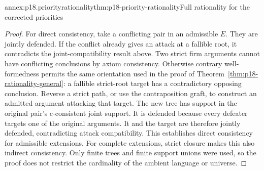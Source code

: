 \begin{annexitem}{annex:p18.priorityrationality}{thm:p18-priority-rationality}{Full rationality for the corrected priorities}
\begin{proof}
For direct consistency, take a conflicting pair in an admissible \(E\).
They are jointly defended. If the conflict already gives an attack at
a fallible root, it contradicts the joint-compatibility result above.
Two strict firm arguments cannot have conflicting conclusions by axiom
consistency. Otherwise contrary well-formedness permits the same
orientation used in the proof of
Theorem~\ref{thm:p18-rationality-general}: a fallible strict-root target
has a contradictory opposing conclusion.
Reverse a strict path, or use the contraposition graft, to construct
an admitted argument attacking that target.
The new tree has support in the original pair's c-consistent joint
support. It is defended because every defeater targets one of the
original arguments. It and the target are therefore jointly defended,
contradicting attack compatibility.
This establishes direct consistency for admissible extensions.
For complete extensions, strict closure makes this also indirect
consistency.
Only finite trees and finite support unions were used, so the proof
does not restrict the cardinality of the ambient language or universe.
\end{proof}
\end{annexitem}

